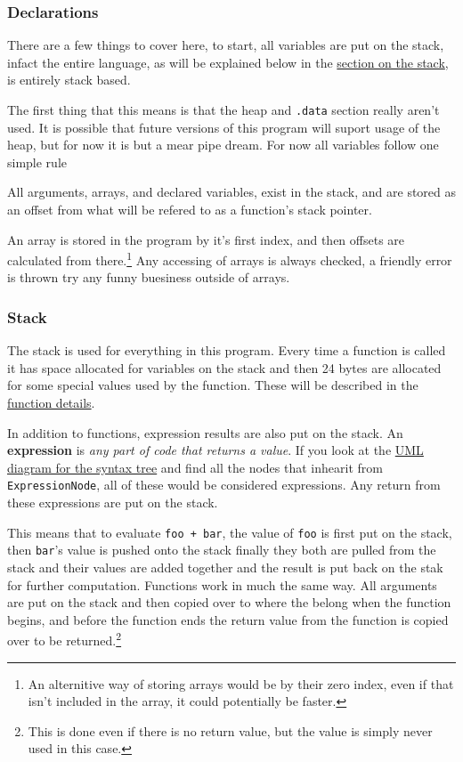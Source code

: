 \documentclass{article}
\def\syntaxtreeUML{SyntaxTreeUML.png}
\begin{document}
\subsubsection{Declarations} \label{declarations}
There are a few things to cover here, to start, all variables are put on the stack, infact the entire language, as will be explained below in the \hyperref[stack]{section on the stack}, is entirely stack based.

The first thing that this means is that the heap and \texttt{.data} section really aren't used. It is possible that future versions of this program will suport usage of the heap, but for now it is but a mear pipe dream. For now all variables follow one simple rule

All arguments, arrays, and declared variables, exist in the stack, and are stored as an offset from what will be refered to as a function's stack pointer.

An array is stored in the program by it's first index, and then offsets are calculated from there.\footnote{An alternitive way of storing arrays would be by their zero index, even if that isn't included in the array, it could potentially be faster.} Any accessing of arrays is always checked, a friendly error is thrown try any funny buesiness outside of arrays.

\subsubsection{Stack}\label{stack}
The stack is used for everything in this program. Every time a function is called it has space allocated for variables on the stack and then 24 bytes are allocated for some special values used by the function. These will be described in the \hyperref[function]{function details}.

In addition to functions, expression results are also put on the stack. An \textbf{expression} is \emph{any part of code that returns a value}. If you look at the \href{\syntaxtreeUML}{UML diagram for the syntax tree} and find all the nodes that inhearit from \texttt{ExpressionNode}, all of these would be considered expressions. Any return from these expressions are put on the stack.

This means that to evaluate \texttt{foo + bar}, the value of \texttt{foo} is first put on the stack, then \texttt{bar}'s value is pushed onto the stack finally they both are pulled from the stack and their values are added together and the result is put back on the stak for further computation. Functions work in much the same way. All arguments are put on the stack and then copied over to where the belong when the function begins, and before the function ends the return value from the function is copied over to be returned.\footnote{This is done even if there is no return value, but the value is simply never used in this case.}
\end{document}
